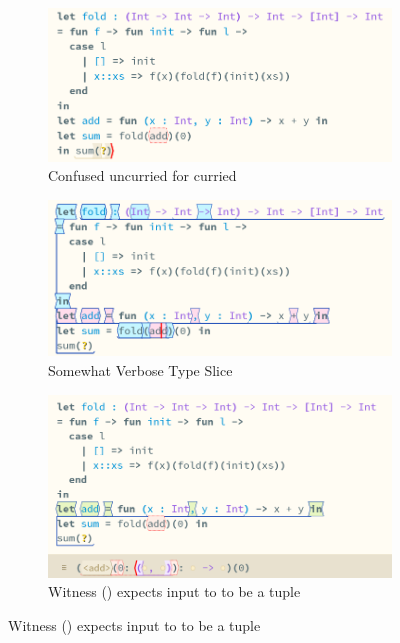 \begin{figure}[h]
\begin{subfigure}{0.49\textwidth}
\includegraphics[width=1\textwidth]{Media/Figures/curries}
\caption{Confused uncurried for curried }
\end{subfigure}
\begin{subfigure}{0.49\textwidth}
\includegraphics[width=1\textwidth]{Media/Figures/curries_type_slice}
\caption{Somewhat Verbose Type Slice}
\end{subfigure}
\begin{subfigure}{0.49\textwidth}
\includegraphics[width=1\textwidth]{Media/Figures/curries_expects_tuple}
\caption{Witness (\code{[0]}) expects input to  to be a tuple}

\end{subfigure}
\end{figure}
